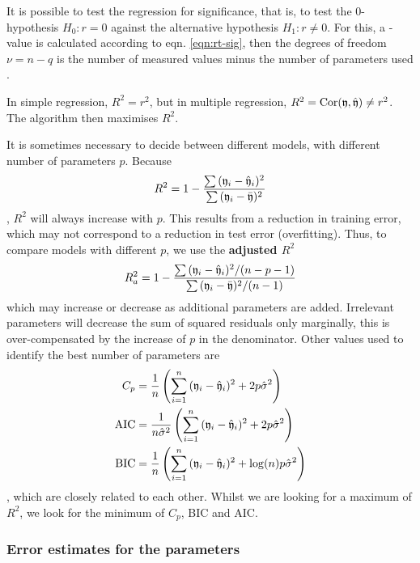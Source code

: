 \begin{refsection}
It is possible to test the regression for significance, that is, to test the 0-hypothesis \(H_0 : r = 0 \) against the alternative hypothesis \(H_1 : r \neq 0 \). For this, a -value is calculated according to eqn. \ref{eqn:rt-sig}, then the degrees of freedom \(\nu = n - q \) is the number of measured values  minus the number of parameters used .

In simple regression, \(R^2 = r^2 \), but in multiple regression, \(R^2 = \mathrm{Cor}(\mathfrak{y},\hat{\mathfrak{y}}) \neq r^2 \). The algorithm then maximises \(R^2 \).

It is sometimes necessary to decide between different models, with different number of parameters \(p \). Because
\begin{equation}
  R^2 = 1 - \frac{\sum{(\ensuremath{\mathfrak{y}}_i - \hat{\ensuremath{\mathfrak{y}}}_i)^2}}{\sum{(\ensuremath{\mathfrak{y}}_i - \bar{\ensuremath{\mathfrak{y}}})^2}}
\end{equation}
, \(R^2 \) will always increase with \(p \). This results from a reduction in training error, which may not correspond to a reduction in test error (overfitting). Thus, to compare models with different \(p \), we use the \textbf{adjusted \(R^2 \)}
\begin{equation}
  R^2_a = 1 - \frac{\sum{(\ensuremath{\mathfrak{y}}_i - \hat{\ensuremath{\mathfrak{y}}}_i)^2} / (n-p-1)}{\sum{(\ensuremath{\mathfrak{y}}_i - \bar{\ensuremath{\mathfrak{y}}})^2} / (n-1)}
\end{equation}
which may increase or decrease as additional parameters are added. Irrelevant parameters will decrease the sum of squared residuals only marginally, this is over-compensated by the increase of \(p \) in the denominator.
Other values used to identify the best number of parameters are
\begin{align}
  C_p          &= \frac{1}{n} \left(\sum_{i=1}^n{(\mathfrak{y}_i - \hat{\mathfrak{y}}_i)^2} + 2p\hat{\sigma}^2\right) \\
  \mathrm{AIC} &= \frac{1}{n\hat{\sigma}^2} \left(\sum_{i=1}^n{(\mathfrak{y}_i - \hat{\mathfrak{y}}_i)^2} + 2p\hat{\sigma}^2\right) \\
  \mathrm{BIC} &= \frac{1}{n} \left(\sum_{i=1}^n{(\mathfrak{y}_i - \hat{\mathfrak{y}}_i)^2} + \log(n)p\hat{\sigma}^2\right)
\end{align}
, which are closely related to each other. Whilst we are looking for a maximum of \(R^2 \), we look for the minimum of \(C_p \), \acs{BIC} and \acs{AIC}.

\subsubsection{Error estimates for the parameters }


\end{refsection}
